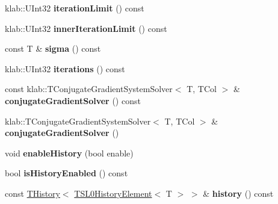 \begin{DoxyCompactItemize}
\item 
klab\+::\+U\+Int32 {\bfseries iteration\+Limit} () const \hypertarget{classkl1p_1_1TSL0Solver_a55435d6ec66a33870db0f64d8672b3bf}{}\label{classkl1p_1_1TSL0Solver_a55435d6ec66a33870db0f64d8672b3bf}

\item 
klab\+::\+U\+Int32 {\bfseries inner\+Iteration\+Limit} () const \hypertarget{classkl1p_1_1TSL0Solver_aa649dc13c6d5ac29b83d074bc2cef1a4}{}\label{classkl1p_1_1TSL0Solver_aa649dc13c6d5ac29b83d074bc2cef1a4}

\item 
const T \& {\bfseries sigma} () const \hypertarget{classkl1p_1_1TSL0Solver_a97098aa969528f779ec74071de540967}{}\label{classkl1p_1_1TSL0Solver_a97098aa969528f779ec74071de540967}

\item 
klab\+::\+U\+Int32 {\bfseries iterations} () const \hypertarget{classkl1p_1_1TSL0Solver_a2a6e1888b54fcaeec7c2081c6375874f}{}\label{classkl1p_1_1TSL0Solver_a2a6e1888b54fcaeec7c2081c6375874f}

\item 
const klab\+::\+T\+Conjugate\+Gradient\+System\+Solver$<$ T, T\+Col $>$ \& {\bfseries conjugate\+Gradient\+Solver} () const \hypertarget{classkl1p_1_1TSL0Solver_ac52926393ef0e893b48fc038cd51318b}{}\label{classkl1p_1_1TSL0Solver_ac52926393ef0e893b48fc038cd51318b}

\item 
klab\+::\+T\+Conjugate\+Gradient\+System\+Solver$<$ T, T\+Col $>$ \& {\bfseries conjugate\+Gradient\+Solver} ()\hypertarget{classkl1p_1_1TSL0Solver_a0ba5e74e1bbc7b3f30ba0004349e97ba}{}\label{classkl1p_1_1TSL0Solver_a0ba5e74e1bbc7b3f30ba0004349e97ba}

\item 
void {\bfseries enable\+History} (bool enable)\hypertarget{classkl1p_1_1TSL0Solver_a73293535c539e935d2e1679a2b082bf9}{}\label{classkl1p_1_1TSL0Solver_a73293535c539e935d2e1679a2b082bf9}

\item 
bool {\bfseries is\+History\+Enabled} () const \hypertarget{classkl1p_1_1TSL0Solver_adc3e207a089472d359201ff2c5b6f1a2}{}\label{classkl1p_1_1TSL0Solver_adc3e207a089472d359201ff2c5b6f1a2}

\item 
const \hyperlink{classkl1p_1_1THistory}{T\+History}$<$ \hyperlink{classkl1p_1_1TSL0HistoryElement}{T\+S\+L0\+History\+Element}$<$ T $>$ $>$ \& {\bfseries history} () const \hypertarget{classkl1p_1_1TSL0Solver_ab350b0a8f29caf846fef72b46b02c3b5}{}\label{classkl1p_1_1TSL0Solver_ab350b0a8f29caf846fef72b46b02c3b5}


\end{DoxyCompactItemize}
